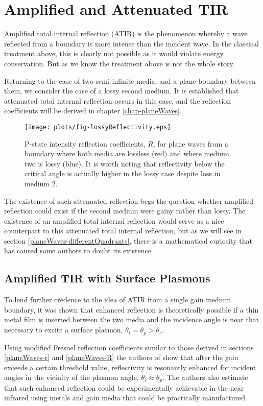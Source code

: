 \documentclass[12pt]{uthesis-v12}
\begin{document}
\section{Amplified and Attenuated TIR}
Amplified total internal reflection (ATIR) is the phenomenon whereby a wave reflected from a boundary is more intense than the incident wave.  In the classical treatment above, this is clearly not possible as it would violate energy conservation. But as we know the treatment above is not the whole story.

Returning to the case of two semi-infinite media, and a plane boundary between them, we consider the case of a lossy second medium. It is established \cite{Fan} \cite{Willis} that attenuated total internal reflection occurs in this case, and the reflection coefficients will be derived in chapter \ref{chap-planeWaves}.  

\begin{figure}[ht]
 \centering
 \texttt{[image: plots/fig-lossyReflectivity.eps]}
 \caption[Attenuated reflectivity from a lossy boundary.]
         {P-state intensity reflection coefficients, $R$, for plane waves from a boundary where both media are lossless (red) and where medium two is lossy (blue). It is worth noting that reflectivity below the critical angle is actually higher in the lossy case despite loss in medium 2.
 \label{fig-lossyReflectivity}}
\end{figure}

The existence of such attenuated reflection begs the question whether amplified reflection could exist if the second medium were gainy rather than lossy.  The existence of an amplified total internal reflection would serve as a nice counterpart to this attenuated total internal reflection, but as we will see in section \ref{planeWaves-differentQuadrants}, there is a mathematical curiosity that has caused some authors to doubt its existence.

\subsection{Amplified TIR with Surface Plasmons}
To lend further credence to the idea of ATIR from a single gain medium boundary, it was shown\cite{Plotz} that enhanced reflection is theoretically possible if a thin metal film is inserted between the two media and the incidence angle is near that necessary to excite a surface plasmon, $\theta_i=\theta_p > \theta_c$.

Using modified Fresnel reflection coefficients similar to those derived in sections \ref{planeWaves-r} and \ref{planeWaves-R} the authors of \cite{Plotz} show that after the gain exceeds a certain threshold value, reflectivity is resonantly enhanced for incident angles in the vicinity of the plasmon angle, $\theta_i\approx\theta_p$. The authors also estimate that such enhanced reflection could be experimentally achievable in the near infrared using metals and gain media that could be practically manufactured.
\end{document}
